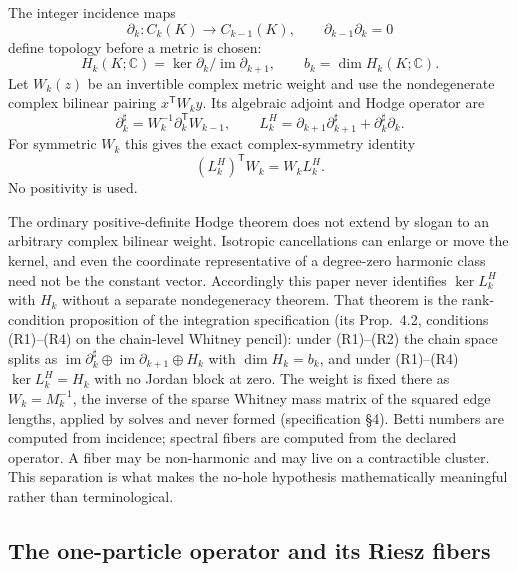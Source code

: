\documentclass[11pt,letterpaper]{article}
\begin{document}
The integer incidence maps
\begin{equation*}
  \partial_k:C_k(K)\longrightarrow C_{k-1}(K),
  \qquad \partial_{k-1}\partial_k=0
\end{equation*}
define topology before a metric is chosen:
\begin{equation*}
  H_k(K;\mathbb C)=\ker\partial_k/\operatorname{im}\partial_{k+1},
  \qquad b_k=\dim H_k(K;\mathbb C).
\end{equation*}
Let $W_k(z)$ be an invertible complex metric weight and use the nondegenerate
complex bilinear pairing $x^{\mathsf T}W_ky$. Its algebraic adjoint and Hodge
operator are
\begin{equation*}
  \partial_k^\sharp=W_k^{-1}\partial_k^{\mathsf T}W_{k-1},
  \qquad
  L_k^{H}=\partial_{k+1}\partial_{k+1}^{\sharp}
          +\partial_k^{\sharp}\partial_k .
\end{equation*}
For symmetric $W_k$ this gives the exact complex-symmetry identity
\begin{equation*}
  (L_k^{H})^{\mathsf T}W_k=W_kL_k^{H}.
\end{equation*}
No positivity is used.

The ordinary positive-definite Hodge theorem does not extend by slogan to an
arbitrary complex bilinear weight. Isotropic cancellations can enlarge or
move the kernel, and even the coordinate representative of a degree-zero
harmonic class need not be the constant vector. Accordingly this paper never
identifies $\ker L_k^H$ with $H_k$ without a separate nondegeneracy theorem.
That theorem is the rank-condition proposition of the integration
specification \cite{whitneyspec} (its Prop.~4.2, conditions (R1)--(R4) on the
chain-level Whitney pencil): under (R1)--(R2) the chain space splits as
$\operatorname{im}\partial_k^\sharp\oplus\operatorname{im}\partial_{k+1}\oplus H_k$
with $\dim H_k=b_k$, and under (R1)--(R4) $\ker L_k^H=H_k$ with no Jordan block
at zero. The weight is fixed there as $W_k=M_k^{-1}$, the inverse of the sparse
Whitney mass matrix of the squared edge lengths, applied by solves and never
formed (specification \S4).
Betti numbers are computed from incidence; spectral fibers are computed from
the declared operator. A fiber may be non-harmonic and may live on a
contractible cluster. This separation is what makes the no-hole hypothesis
mathematically meaningful rather than terminological.

\subsection{The one-particle operator and its Riesz fibers}
\end{document}
